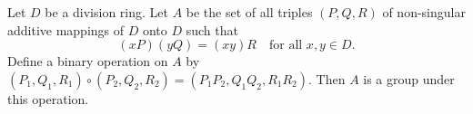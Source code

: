 Let $D$ be a division ring. Let $A$ be the set of all triples $(P, Q, R)$ of non-singular additive mappings of $D$ onto $D$ such that
$$(xP)(yQ) = (xy)R \quad \text{for all } x, y \in D.$$
Define a binary operation on $A$ by $(P_1, Q_1, R_1) \circ (P_2, Q_2, R_2) = (P_1 P_2, Q_1 Q_2, R_1 R_2)$. Then $A$ is a group under this operation.
